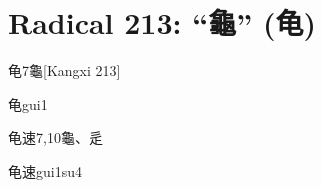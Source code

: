 
\section*{Radical 213: ``⿔'' (龟)}

\begin{entry}{龟}{7}{⿔}[Kangxi 213]
  \begin{phonetics}{龟}{gui1}
  \end{phonetics}
\end{entry}

\begin{entry}{龟速}{7,10}{⿔、⾡}
  \begin{phonetics}{龟速}{gui1su4}
  \end{phonetics}
\end{entry}


